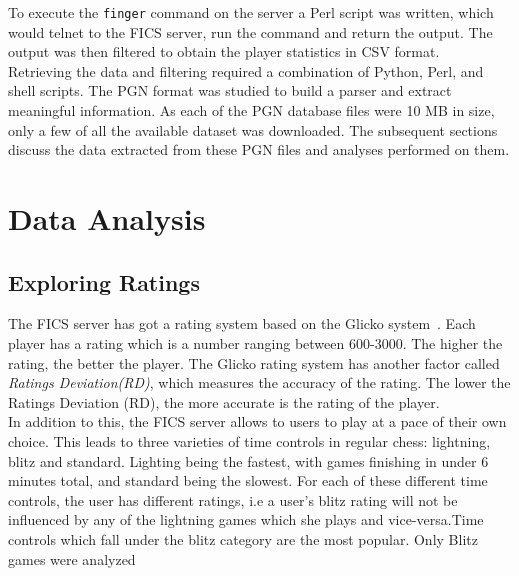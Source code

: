 \documentclass{article}
\begin{document}
To execute the \verb=finger= command on the server a Perl script was written, which would telnet to the FICS server, run the command and return the output. The output was then filtered to obtain the player statistics in CSV format. \\

Retrieving the data and filtering required a combination of Python, Perl, and shell scripts. The PGN format was studied to build a parser and extract meaningful information. As each of the PGN database files were 10 MB in size, only a few of all the available dataset was downloaded. The subsequent sections discuss the data extracted from these PGN files and analyses performed on them.


\section{Data Analysis}
\label{sec:analysis}
\subsection{Exploring Ratings}
The FICS server has got a rating system based on the Glicko system~\cite{spec:glicko}. Each player has a rating which is a number ranging between 600-3000. The higher the rating, the better the player. The Glicko rating system has another factor called \textsl{Ratings Deviation(RD)}, which measures the accuracy of the rating. The lower the Ratings Deviation (RD), the more accurate is the rating of the player.\\

In addition to this, the FICS server allows to users to play at a pace of their own choice. This leads to three varieties of time controls in regular chess: lightning, blitz and standard. Lighting being the fastest, with games finishing in under 6 minutes total, and standard being the slowest. For each of these different time controls, the user has different ratings, i.e a user's blitz rating will not be influenced by any of the lightning games which she plays and vice-versa.Time controls which fall under the blitz category are the most popular. Only Blitz games were analyzed\\
\end{document}
